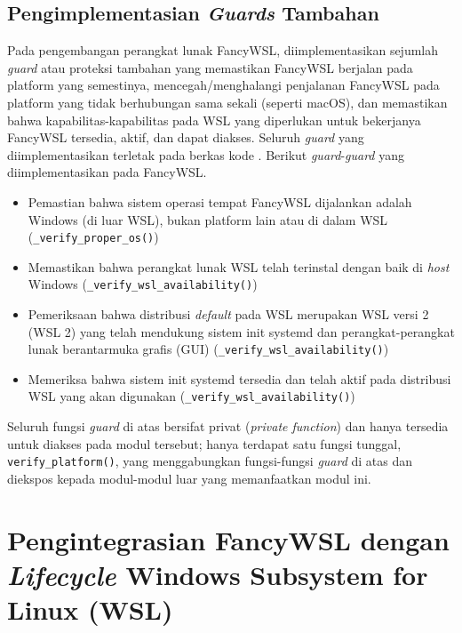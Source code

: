 \subsection{Pengimplementasian \textit{Guards} Tambahan}

Pada pengembangan perangkat lunak FancyWSL, diimplementasikan sejumlah \textit{guard} atau proteksi tambahan yang memastikan FancyWSL berjalan pada platform yang semestinya, mencegah/menghalangi penjalanan FancyWSL pada platform yang tidak berhubungan sama sekali (seperti macOS), dan memastikan bahwa kapabilitas-kapabilitas pada WSL yang diperlukan untuk bekerjanya FancyWSL tersedia, aktif, dan dapat diakses. Seluruh \textit{guard} yang diimplementasikan terletak pada berkas kode . Berikut \textit{guard}-\textit{guard} yang diimplementasikan pada FancyWSL.

\begin{itemize}
    \item Pemastian bahwa sistem operasi tempat FancyWSL dijalankan adalah Windows (di luar WSL), bukan platform lain atau di dalam WSL (\verb|_verify_proper_os()|)
    
    \item Memastikan bahwa perangkat lunak WSL telah terinstal dengan baik di \textit{host} Windows (\verb|_verify_wsl_availability()|)
    
    \item Pemeriksaan bahwa distribusi \textit{default} pada WSL merupakan WSL versi 2 (WSL 2) yang telah mendukung sistem init systemd dan perangkat-perangkat lunak berantarmuka grafis (GUI) (\verb|_verify_wsl_availability()|)
    
    \item Memeriksa bahwa sistem init systemd tersedia dan telah aktif pada distribusi WSL yang akan digunakan (\verb|_verify_wsl_availability()|)
\end{itemize}

Seluruh fungsi \textit{guard} di atas bersifat privat (\textit{private function}) dan hanya tersedia untuk diakses pada modul tersebut; hanya terdapat satu fungsi tunggal, \verb|verify_platform()|, yang menggabungkan fungsi-fungsi \textit{guard} di atas dan diekspos kepada modul-modul luar yang memanfaatkan modul ini.

\section{Pengintegrasian FancyWSL dengan \textit{Lifecycle} Windows Subsystem for Linux (WSL)}

